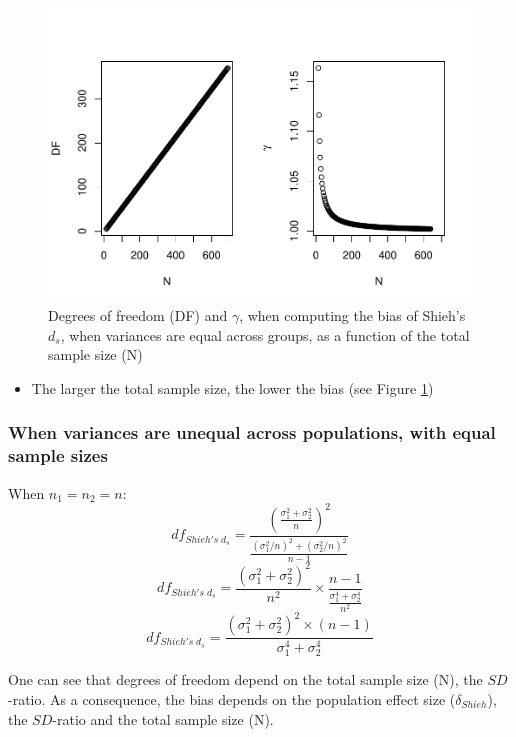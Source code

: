 \documentclass[
  man]{apa6}
\providecommand{\tightlist}{%
  \setlength{\itemsep}{0pt}\setlength{\parskip}{0pt}}
\begin{document}
\begin{figure}
\centering
\includegraphics{Theoretical-Bias-of-all-estimators-as-a-function-of-population-parameters_files/figure-latex/biasshiehhomNsize2-1.pdf}
\caption{\label{fig:biasshiehhomNsize2}Degrees of freedom (DF) and \(\gamma\), when computing the bias of Shieh's \(d_s\), when variances are equal across groups, as a function of the total sample size (N)}
\end{figure}

\begin{itemize}
\tightlist
\item
  The larger the total sample size, the lower the bias (see Figure \ref{fig:biasshiehhomNsize2})
\end{itemize}

\hypertarget{when-variances-are-unequal-across-populations-with-equal-sample-sizes-1}{%
\subsubsection{When variances are unequal across populations, with equal sample sizes}\label{when-variances-are-unequal-across-populations-with-equal-sample-sizes-1}}

When \(n_1=n_2=n\):
\[df_{Shieh's \; d_s} = \frac{\left( \frac{\sigma_1^2+\sigma_2^2}{n} \right)^2}{\frac{(\sigma_1^2/n)^2+(\sigma_2^2/n)^2}{n-1}}\]
\[df_{Shieh's \; d_s} = \frac{(\sigma_1^2+\sigma_2^2)^2}{n^2} \times\frac{n-1}{\frac{\sigma_1^4+\sigma_2^4}{n^2}}\]
\[df_{Shieh's \; d_s} = \frac{(\sigma_1^2+\sigma_2^2)^2 \times (n-1)}{\sigma_1^4+\sigma_2^4}\]

One can see that degrees of freedom depend on the total sample size (N), the \(SD\)-ratio. As a consequence, the bias depends on the population effect size (\(\delta_{Shieh}\)), the \(SD\)-ratio and the total sample size (N).
\end{document}
